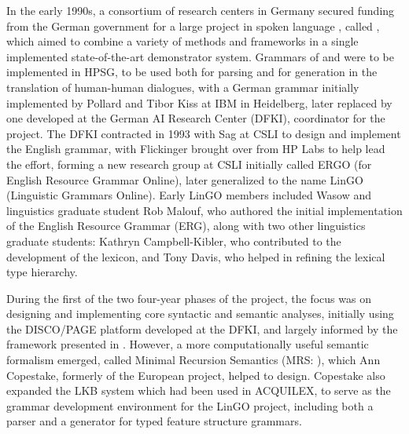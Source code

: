 \documentclass[output=paper]{langsci/langscibook}
\begin{document}
In the early 1990s, a consortium of research centers in Germany secured funding from the German government for a large project in spoken language , called \verbmobil \citep{Wahlster2000a-ed}, which aimed to combine a variety of methods and frameworks in a single implemented state-of-the-art demonstrator system.  Grammars of  and  were to be implemented in HPSG, to be used both for parsing and for generation in the translation of human-human dialogues, with a German grammar initially implemented by Pollard and Tibor Kiss at IBM in Heidelberg, later replaced by one developed at the German AI Research Center (DFKI), coordinator for the \verbmobil project.  The DFKI contracted in 1993 with Sag at CSLI to design and implement the English grammar, with Flickinger brought over from HP Labs to help lead the effort, forming a new research group at CSLI initially called ERGO (for English Resource Grammar Online), later generalized to the name LinGO (Linguistic Grammars Online).  Early LinGO members included Wasow and linguistics graduate student Rob Malouf, who authored the initial implementation of the English Resource Grammar (ERG), along with two other linguistics graduate students: Kathryn Campbell-Kibler, who contributed to the development of the lexicon, and Tony Davis, who helped in refining the lexical type hierarchy.

During the first of the two four-year phases of the \verbmobil project, the focus was on designing and implementing core syntactic and semantic analyses, initially using the DISCO/PAGE platform \citep{DISCO94} developed at the DFKI, and largely informed by the framework presented in \citet{ps2}.  However, a more computationally useful semantic formalism emerged, called Minimal Recursion Semantics (MRS: \citet*{CFPS2005a}), which Ann Copestake, formerly of the European  project, helped to design.  Copestake also expanded the LKB system \citep{Copestake2002a-Short} which had been used in ACQUILEX, to serve as the grammar development environment for the LinGO project, including both a parser and a generator for typed feature structure grammars.
\end{document}
